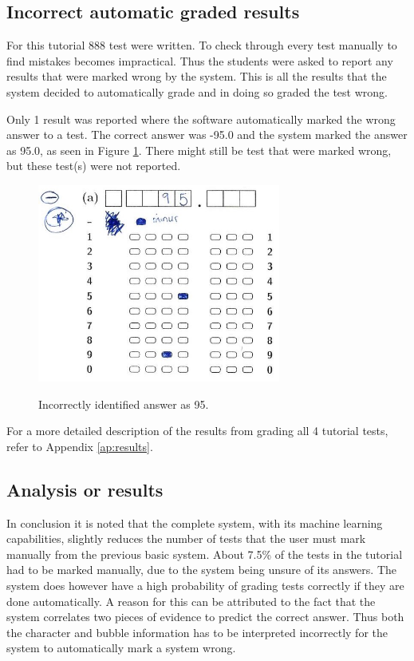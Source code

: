 \subsection{Incorrect automatic graded results}

For this tutorial 888 test were written. To check through every test manually to find mistakes becomes impractical. Thus the students were asked to report any results that were marked wrong by the system. This is all the results that the system decided to automatically grade and in doing so graded the test wrong.

Only 1 result was reported where the software automatically marked the wrong answer to a test. The correct answer was -95.0 and the system marked the answer as 95.0, as seen in Figure \ref{fig:wrongAns}. There might still be test that were marked wrong, but these test(s) were not reported.

\begin{figure}
  \centering
  \includegraphics[width=8cm]{wrongResult}\\
  \caption{Incorrectly identified answer as 95.}
  \label{fig:wrongAns}
\end{figure}

For a more detailed description of the results from grading all 4 tutorial tests, refer to Appendix \ref{ap:results}.

\subsection{Analysis or results}

In conclusion it is noted that the complete system, with its machine learning capabilities, slightly reduces the number of tests that the user must mark manually from the previous basic system. About 7.5\% of the tests in the tutorial had to be marked manually, due to the system being unsure of its answers. The system does however have a high probability of grading tests correctly if they are done automatically. A reason for this can be attributed to the fact that the system correlates two pieces of evidence to predict the correct answer. Thus both the character and bubble information has to be interpreted incorrectly for the system to automatically mark a system wrong.


